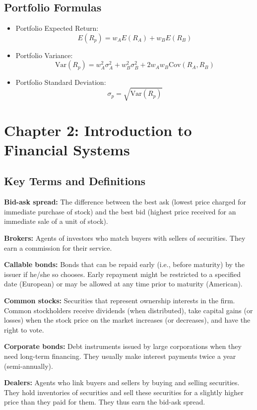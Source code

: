 \documentclass[twoside,openany]{book}
\begin{document}
\section*{Portfolio Formulas}
\begin{itemize}
    \item Portfolio Expected Return:
    \[ E(R_p) = w_A E(R_A) + w_B E(R_B) \]
    \item Portfolio Variance:
    \[ \text{Var}(R_p) = w_A^2 \sigma_A^2 + w_B^2 \sigma_B^2 + 2w_Aw_B\text{Cov}(R_A, R_B) \]
    \item Portfolio Standard Deviation:
    \[ \sigma_p = \sqrt{\text{Var}(R_p)} \]
\end{itemize}

\chapter*{Chapter 2: Introduction to Financial Systems}

\section*{\textbf{Key Terms and Definitions}}

\textbf{Bid-ask spread:} The difference between the best ask (lowest price charged for immediate purchase of stock) and the best bid (highest price received for an immediate sale of a unit of stock).

\textbf{Brokers:} Agents of investors who match buyers with sellers of securities. They earn a commission for their service.

\textbf{Callable bonds:} Bonds that can be repaid early (i.e., before maturity) by the issuer if he/she so chooses. Early repayment might be restricted to a specified date (European) or may be allowed at any time prior to maturity (American).

\textbf{Common stocks:} Securities that represent ownership interests in the firm. Common stockholders receive dividends (when distributed), take capital gains (or losses) when the stock price on the market increases (or decreases), and have the right to vote.

\textbf{Corporate bonds:} Debt instruments issued by large corporations when they need long-term financing. They usually make interest payments twice a year (semi-annually).

\textbf{Dealers:} Agents who link buyers and sellers by buying and selling securities. They hold inventories of securities and sell these securities for a slightly higher price than they paid for them. They thus earn the bid-ask spread.
\end{document}
